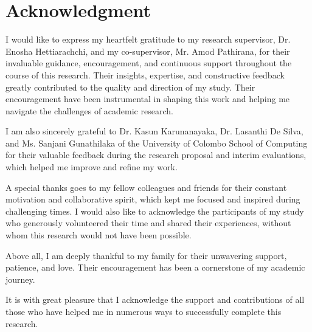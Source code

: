 \chapter*{Acknowledgment}

I would like to express my heartfelt gratitude to my research supervisor, Dr. Enosha Hettiarachchi, and my co-supervisor, Mr. Amod Pathirana, for their invaluable guidance, encouragement, and continuous support throughout the course of this research. Their insights, expertise, and constructive feedback greatly contributed to the quality and direction of my study. Their encouragement have been instrumental in shaping this work and helping me navigate the challenges of academic research.

I am also sincerely grateful to Dr. Kasun Karunanayaka, Dr. Lasanthi De Silva, and Ms. Sanjani Gunathilaka of the University of Colombo School of Computing for their valuable feedback during the research proposal and interim evaluations, which helped me improve and refine my work.

A special thanks goes to my fellow colleagues and friends for their constant motivation and collaborative spirit, which kept me focused and inspired during challenging times. I would also like to acknowledge the participants of my study who generously volunteered their time and shared their experiences, without whom this research would not have been possible.

Above all, I am deeply thankful to my family for their unwavering support, patience, and love. Their encouragement has been a cornerstone of my academic journey.

It is with great pleasure that I acknowledge the support and contributions of all those who have helped me in numerous ways to successfully complete this research.
